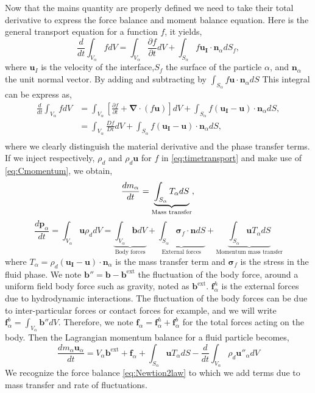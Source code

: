 Now that the mains quantity are properly defined we need to take their total derivative to express the force balance and moment balance equation. 
Here is the general transport equation for a function $f$, it yields,
\begin{equation}
    \frac{d}{dt}\int_{V_\alpha} f dV 
    = \int_{V_\alpha} \frac{\partial f}{\partial t}dV 
    + \int_{S_\alpha} f \bm{u_I}\cdot \bm{n}_\alpha d S_f,
\end{equation}
where $\bm{u}_I$ is the velocity of the interface,$S_f$ the surface of the particle $\alpha$, and $\bm{n}_\alpha$ the unit normal vector. 
By adding and subtracting by $\int_{S_\alpha} f \bm{u}\cdot \bm{n}_\alpha dS$ This integral can be express as,
\begin{align}
    \label{eq:timetransport}
    \frac{d}{dt}\int_{V_\alpha} f dV &
    = \int_{V_\alpha}\left[ \frac{\partial f}{\partial t} + \bm{\nabla}\cdot\left(f\bm{u}\right) \right]dV + \int_{S_\alpha} f (\bm{u_I}-\bm{u})\cdot \bm{n}_\alpha d S,\\
    &= \int_{V_\alpha} \frac{D f}{D t} dV + \int_{S_\alpha} f (\bm{u_I}-\bm{u})\cdot \bm{n}_\alpha d S,\\
\end{align}
where we clearly distinguish the material derivative and the phase transfer terms.
If we inject respectively, $\rho_d$ and $\rho_d \bm{u}$ for $f$ in \ref{eq:timetransport} and make use of \ref{eq:Cmomentum}, we obtain, 
\begin{equation}
    \frac{d m_\alpha}{dt} 
    = \underbrace{\int_{S_\alpha} T_\alpha dS}_{\text{Mass transfer}},\\
\end{equation}    
\begin{equation}
    \frac{d\bm{p}_\alpha}{dt} 
    = \int_{V_\alpha} \bm{u} \rho_d dV 
    = \underbrace{\int_{V_\alpha} \bm{b} dV}_{\text{Body forces}} 
    + \underbrace{\int_{S_\alpha} \bm{\sigma}_f \cdot \bm{n} dS}_{\text{External forces}}
    + \underbrace{\int_{S_\alpha} \bm{u} T_\alpha dS}_{\text{Momentum mass transfer}}
\end{equation}
where $T_\alpha = \rho_d\left(\bm{u_I}-\bm{u}\right)\cdot\bm{n}_\alpha$ is the mass transfer term and $\bm{\sigma}_f$ is the stress in the fluid phase. 
We note $\bm{b''} = \bm{b} - \bm{b}^{\text{ext}}$ the fluctuation of the body force, around a uniform field body force such as gravity, noted as $ \bm{b}^{\text{ext}}$.
$\bm{f}^h_\alpha$ is the external forces due to hydrodynamic interactions.
The fluctuation of the body forces can be due to inter-particular forces or contact forces for example, and we will write  $\bm{f}^b_\alpha = \int_{V_\alpha} \bm{b''} dV$.
Therefore, we note $\bm{f}_\alpha = \bm{f}^h_\alpha + \bm{f}^b_\alpha$ for the total forces acting on the body.
Then the Lagrangian momentum balance for a fluid particle becomes, 
\begin{equation}
    \frac{d m_\alpha \bm{u}_{\alpha}}{dt} 
    = V_\alpha\bm{b}^{\text{ext}} 
    + \bm{f}_\alpha
    + \int_{S_\alpha} \bm{u} T_\alpha dS
    - \frac{d}{dt}  \int_{V_\alpha} \rho_d \bm{u''}_\alpha dV
\end{equation}
We recognize the force balance \ref{eq:Newtion2law} to which we add terms due to mass transfer and rate of fluctuations. 

